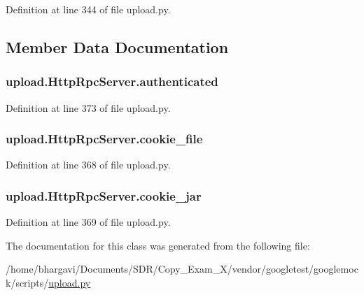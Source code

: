 Definition at line 344 of file upload.\+py.



\subsection{Member Data Documentation}
\subsubsection[{\texorpdfstring{authenticated}{authenticated}}]{\setlength{\rightskip}{0pt plus 5cm}upload.\+Http\+Rpc\+Server.\+authenticated}\hypertarget{classupload_1_1_http_rpc_server_aaa356e2491537dd0d4bfc5b1bb0fec96}{}\label{classupload_1_1_http_rpc_server_aaa356e2491537dd0d4bfc5b1bb0fec96}


Definition at line 373 of file upload.\+py.

\subsubsection[{\texorpdfstring{cookie\+\_\+file}{cookie_file}}]{\setlength{\rightskip}{0pt plus 5cm}upload.\+Http\+Rpc\+Server.\+cookie\+\_\+file}\hypertarget{classupload_1_1_http_rpc_server_ad5c1a730c030f9d3b5f70c2e0d8b9a1d}{}\label{classupload_1_1_http_rpc_server_ad5c1a730c030f9d3b5f70c2e0d8b9a1d}


Definition at line 368 of file upload.\+py.

\subsubsection[{\texorpdfstring{cookie\+\_\+jar}{cookie_jar}}]{\setlength{\rightskip}{0pt plus 5cm}upload.\+Http\+Rpc\+Server.\+cookie\+\_\+jar}\hypertarget{classupload_1_1_http_rpc_server_a1b9c9af7f0a46afd84a9d524782323bf}{}\label{classupload_1_1_http_rpc_server_a1b9c9af7f0a46afd84a9d524782323bf}


Definition at line 369 of file upload.\+py.



The documentation for this class was generated from the following file\+:\begin{DoxyCompactItemize}
\item 
/home/bhargavi/\+Documents/\+S\+D\+R/\+Copy\+\_\+\+Exam\+\_\+X/vendor/googletest/googlemock/scripts/\hyperlink{googlemock_2scripts_2upload_8py}{upload.\+py}\end{DoxyCompactItemize}
